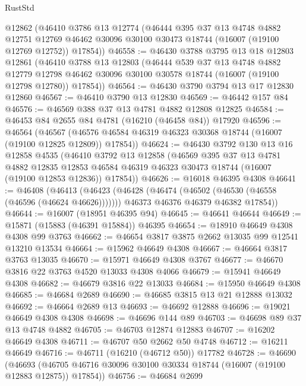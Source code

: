 \begin{lexlean}{RustStd}
\begin{coremodule}
    @12862
    (@46410
      @3786
      @13
      @12774
      (@46444
        @395
        @37
        @13
        @4748
        @4882
        @12751
        @12769
        @46462
        @30096
        @30100
        @30473
        @18744
        (@16007 (@19100 @12769 @12752))
        @17854))
@46558 := @46430
    @3788
    @3795
    @13
    @18
    @12803
    @12861
    (@46410
      @3788
      @13
      @12803
      (@46444
        @539
        @37
        @13
        @4748
        @4882
        @12779
        @12798
        @46462
        @30096
        @30100
        @30578
        @18744
        (@16007 (@19100 @12798 @12780))
        @17854))
@46564 := @46430 @3790 @3794 @13 @17 @12830 @12860
@46567 := @46410 @3790 @13 @12830
@46569 := @46442 @157 @84
@46576 := @46569 @388 @37 @13 @4781 @4882 @12808 @12825
@46584 := @46453 @84 @2655 @84 @4781 (@16210 (@46458 @84)) @17920
@46596 := @46564
    (@46567 (@46576 @46584 @46319 @46323 @30368 @18744 (@16007 (@19100 @12825 @12809)) @17854))
@46624 := @46430
    @3792
    @130
    @13
    @16
    @12858
    @4535
    (@46410
      @3792
      @13
      @12858
      (@46569
        @395
        @37
        @13
        @4781
        @4882
        @12835
        @12853
        @46584
        @46319
        @46323
        @30473
        @18744
        (@16007 (@19100 @12853 @12836))
        @17854))
@46626 := @16018 @46395 @4308
@46641 := @46408
    (@46413
      (@46423
        (@46428 (@46474 (@46502 (@46530 (@46558 (@46596 (@46624 @46626)))))))
        @46373
        @46376
        @46379
        @46382
        @17854))
@46644 := @16007 (@18951 @46395 @94)
@46645 := @46641 @46644
@46649 := @15871 (@15883 (@46391 @15884)) @46395
@46654 := @18910 @46649 @4308 @4308 @99 @3763
@46662 := @46654 @3817 @3875 @2662 @13035 @99 @12541 @13210 @13534
@46664 := @15962 @46649 @4308
@46667 := @46664 @3817 @3763 @13035
@46670 := @15971 @46649 @4308 @3767
@46677 := @46670 @3816 @22 @3763 @4520 @13033 @4308 @4066
@46679 := @15941 @46649 @4308
@46682 := @46679 @3816 @22 @13033
@46684 := @15950 @46649 @4308
@46685 := @46684 @2689
@46690 := @46685 @3815 @13 @21 @12888 @13032
@46692 := @46664 @2689 @13
@46693 := @46692 @12888
@46696 := @19021 @46649 @4308 @4308
@46698 := @46696 @144 @89
@46703 := @46698 @89 @37 @13 @4748 @4882
@46705 := @46703 @12874 @12883
@46707 := @16202 @46649 @4308
@46711 := @46707 @50 @2662 @50 @4748
@46712 := @16211 @46649
@46716 := @46711 (@16210 (@46712 @50)) @17782
@46728 := @46690
    (@46693 (@46705 @46716 @30096 @30100 @30334 @18744 (@16007 (@19100 @12883 @12875)) @17854))
@46756 := @46684
    @2699

\end{coremodule}
\end{lexlean}
